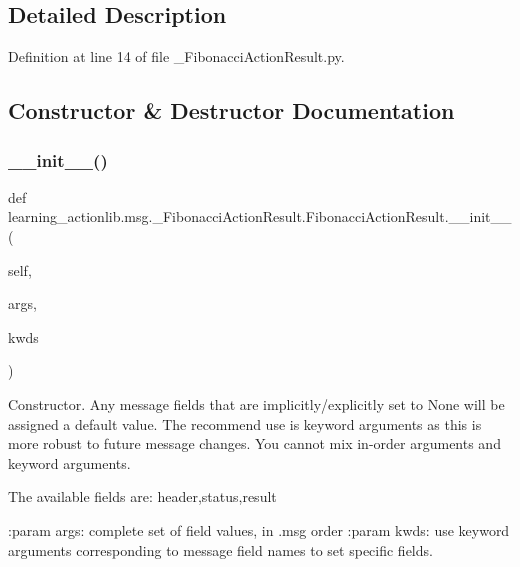 \subsection{Detailed Description}


Definition at line 14 of file \+\_\+\+Fibonacci\+Action\+Result.\+py.



\subsection{Constructor \& Destructor Documentation}
\mbox{\label{classlearning__actionlib_1_1msg_1_1__FibonacciActionResult_1_1FibonacciActionResult_aa7f44ff0213fcdcbf32f8b179d03f686}} 
\subsubsection{\texorpdfstring{\+\_\+\+\_\+init\+\_\+\+\_\+()}{\_\_init\_\_()}}
{\footnotesize\ttfamily def learning\+\_\+actionlib.\+msg.\+\_\+\+Fibonacci\+Action\+Result.\+Fibonacci\+Action\+Result.\+\_\+\+\_\+init\+\_\+\+\_\+ (\begin{DoxyParamCaption}\item[{}]{self,  }\item[{}]{args,  }\item[{}]{kwds }\end{DoxyParamCaption})}

\begin{DoxyVerb}Constructor. Any message fields that are implicitly/explicitly
set to None will be assigned a default value. The recommend
use is keyword arguments as this is more robust to future message
changes.  You cannot mix in-order arguments and keyword arguments.

The available fields are:
   header,status,result

:param args: complete set of field values, in .msg order
:param kwds: use keyword arguments corresponding to message field names
to set specific fields.
\end{DoxyVerb}
 

